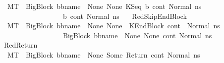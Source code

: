 \begin{isabellebody}
\ \ \ \ {\isachardoublequoteopen}M{\isacharcomma}{\kern0pt}{\isasymLambda}{\isacharcomma}{\kern0pt}{\isasymGamma}{\isacharcomma}{\kern0pt}{\isasymOmega}{\isacharcomma}{\kern0pt}T\ {\isasymturnstile}\ {\isasymlangle}{\isacharparenleft}{\kern0pt}{\isacharparenleft}{\kern0pt}BigBlock\ bb{\isacharunderscore}{\kern0pt}name\ {\isacharbrackleft}{\kern0pt}{\isacharbrackright}{\kern0pt}\ None\ None{\isacharparenright}{\kern0pt}{\isacharcomma}{\kern0pt}\ {\isacharparenleft}{\kern0pt}KSeq\ b\ cont{}{\isacharparenright}{\kern0pt}{\isacharcomma}{\kern0pt}\ Normal\ n{\isacharunderscore}{\kern0pt}s{\isacharparenright}{\kern0pt}{\isasymrangle}\ {\isasymlongrightarrow}\ \isanewline
\ \ \ \ \ \ \ \ \ \ \ \ \ \ \ \ \ \ \ \ {\isacharparenleft}{\kern0pt}b{\isacharcomma}{\kern0pt}\ cont{}{\isacharcomma}{\kern0pt}\ Normal\ n{\isacharunderscore}{\kern0pt}s{\isacharparenright}{\kern0pt}{\isachardoublequoteclose}\isanewline
\isanewline
\ \ {\isacharbar}{\kern0pt}\ RedSkipEndBlock{\isacharcolon}{\kern0pt}\ \isanewline
\ \ \ \ {\isachardoublequoteopen}M{\isacharcomma}{\kern0pt}{\isasymLambda}{\isacharcomma}{\kern0pt}{\isasymGamma}{\isacharcomma}{\kern0pt}{\isasymOmega}{\isacharcomma}{\kern0pt}T\ {\isasymturnstile}\ {\isasymlangle}{\isacharparenleft}{\kern0pt}{\isacharparenleft}{\kern0pt}BigBlock\ bb{\isacharunderscore}{\kern0pt}name\ {\isacharbrackleft}{\kern0pt}{\isacharbrackright}{\kern0pt}\ None\ None{\isacharparenright}{\kern0pt}{\isacharcomma}{\kern0pt}\ \ {\isacharparenleft}{\kern0pt}KEndBlock\ cont{}{\isacharparenright}{\kern0pt}{\isacharcomma}{\kern0pt}\ \ Normal\ n{\isacharunderscore}{\kern0pt}s{\isacharparenright}{\kern0pt}{\isasymrangle}\ {\isasymlongrightarrow}\ \isanewline
\ \ \ \ \ \ \ \ \ \ \ \ \ \ \ \ \ \ \ \ {\isacharparenleft}{\kern0pt}{\isacharparenleft}{\kern0pt}BigBlock\ bb{\isacharunderscore}{\kern0pt}name\ {\isacharbrackleft}{\kern0pt}{\isacharbrackright}{\kern0pt}\ None\ None{\isacharparenright}{\kern0pt}{\isacharcomma}{\kern0pt}\ cont{}{\isacharcomma}{\kern0pt}\ Normal\ n{\isacharunderscore}{\kern0pt}s{\isacharparenright}{\kern0pt}{\isachardoublequoteclose}\isanewline
\isanewline
\ \ {\isacharbar}{\kern0pt}\ RedReturn{\isacharcolon}{\kern0pt}\ \isanewline
\ \ \ \ {\isachardoublequoteopen}M{\isacharcomma}{\kern0pt}{\isasymLambda}{\isacharcomma}{\kern0pt}{\isasymGamma}{\isacharcomma}{\kern0pt}{\isasymOmega}{\isacharcomma}{\kern0pt}T\ {\isasymturnstile}\ {\isasymlangle}{\isacharparenleft}{\kern0pt}BigBlock\ bb{\isacharunderscore}{\kern0pt}name\ {\isacharbrackleft}{\kern0pt}{\isacharbrackright}{\kern0pt}\ None\ {\isacharparenleft}{\kern0pt}Some\ Return{\isacharparenright}{\kern0pt}{\isacharcomma}{\kern0pt}\ cont{}{\isacharcomma}{\kern0pt}\ Normal\ n{\isacharunderscore}{\kern0pt}s{\isacharparenright}{\kern0pt}{\isasymrangle}\ {\isasymlongrightarrow}\ \isanewline

\end{isabellebody}
